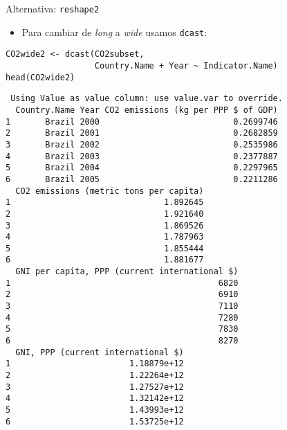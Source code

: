 \documentclass[xcolor={usenames,svgnames,dvipsnames}]{beamer}
\begin{document}
\begin{frame}[fragile,label=sec-4-10]{Alternativa: \texttt{reshape2}}
 \begin{itemize}
\item Para cambiar de \emph{long} a \emph{wide} usamos \texttt{dcast}:
\end{itemize}
\lstset{language=R,label= ,caption= ,numbers=none}
\begin{lstlisting}
CO2wide2 <- dcast(CO2subset,
                  Country.Name + Year ~ Indicator.Name)
head(CO2wide2)
\end{lstlisting}

\begin{verbatim}
 Using Value as value column: use value.var to override.
  Country.Name Year CO2 emissions (kg per PPP $ of GDP)
1       Brazil 2000                           0.2699746
2       Brazil 2001                           0.2682859
3       Brazil 2002                           0.2535986
4       Brazil 2003                           0.2377887
5       Brazil 2004                           0.2297965
6       Brazil 2005                           0.2211286
  CO2 emissions (metric tons per capita)
1                               1.892645
2                               1.921640
3                               1.869526
4                               1.787963
5                               1.855444
6                               1.881677
  GNI per capita, PPP (current international $)
1                                          6820
2                                          6910
3                                          7110
4                                          7280
5                                          7830
6                                          8270
  GNI, PPP (current international $)
1                        1.18879e+12
2                        1.22264e+12
3                        1.27527e+12
4                        1.32142e+12
5                        1.43993e+12
6                        1.53725e+12
\end{verbatim}
\end{frame}
\end{document}
